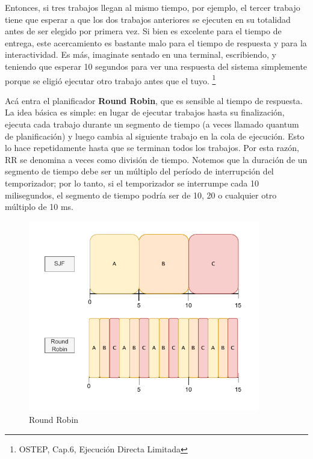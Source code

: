 \documentclass{article}
\begin{document}
Entonces, si tres trabajos llegan al mismo tiempo, por ejemplo, el tercer trabajo tiene que esperar a que los dos trabajos anteriores se ejecuten en su totalidad antes de ser elegido por primera vez. Si bien es excelente para el tiempo de entrega, este acercamiento es bastante malo para el tiempo de respuesta y para la interactividad. Es más, imaginate sentado en una terminal, escribiendo, y teniendo que esperar 10 segundos para ver una respuesta del sistema simplemente porque se eligió ejecutar otro trabajo antes que el tuyo. \footnote{OSTEP, Cap.6, Ejecución Directa Limitada}

Acá entra el planificador \textbf{Round Robin}, que es sensible al tiempo de respuesta. La idea básica es simple: en lugar de ejecutar trabajos hasta su finalización, ejecuta cada trabajo durante un segmento de tiempo (a veces llamado quantum de planificación) y luego cambia al siguiente trabajo en la cola de ejecución. Esto lo hace repetidamente hasta que se terminan todos los trabajos. Por esta razón, RR se denomina a veces como división de tiempo. Notemos que la duración de un segmento de tiempo debe ser un múltiplo del período de interrupción del temporizador; por lo tanto, si el temporizador se interrumpe cada 10 milisegundos, el segmento de tiempo podría ser de 10, 20 o cualquier otro múltiplo de 10 ms.

\begin{figure}[h]
    \centering
    \includegraphics[width=0.9\textwidth]{src/rr.pdf}
    \caption{Round Robin}
\end{figure}
\end{document}
